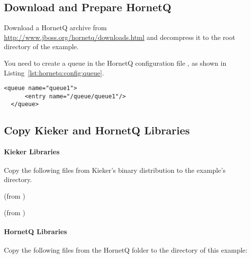 \subsection{Download and Prepare HornetQ}

Download a HornetQ archive from \url{http://www.jboss.org/hornetq/downloads.html} %
and decompress it to the root directory of the example. 

\noindent You need to create a queue in the HornetQ configuration file %
, as shown in Listing~\ref{lst:hornetq:config:queue}.

\setXMLListing
\begin{lstlisting}[caption=Queue definition to be added to the HornetQ configuration file,label=lst:hornetq:config:queue,numbers=none]
  <queue name="queue1">
      <entry name="/queue/queue1"/>
  </queue>
\end{lstlisting}

\subsection{Copy Kieker and HornetQ Libraries}

\paragraph*{Kieker Libraries}

Copy the following files from Kieker's binary distribution to %
the example's  directory.

\medskip

\begin{compactenum}
 \item \file{\mainJarEMF} (from )
 \item \file{\commonsLoggingJar} (from )
\end{compactenum}

\paragraph*{HornetQ Libraries}

Copy the following files from the HornetQ  folder to the %
 directory of this example:

\medskip

\begin{compactenum}
\item {}
\item {}
\item {}
\item {}
\item {}
\end{compactenum}

